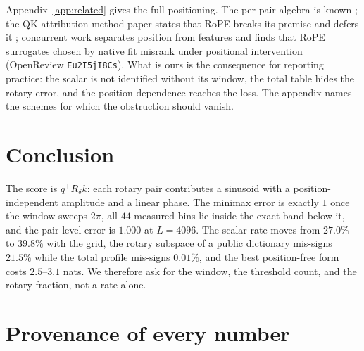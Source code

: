 \documentclass{article}
\theoremstyle{plain}
\theoremstyle{remark}
\newcommand{\R}{R}
\begin{document}
Appendix~\ref{app:related} gives the full positioning. The per-pair algebra is
known \citep{chachamovits2026phase,liang2026roaware}; the QK-attribution method
paper states that RoPE breaks its premise and defers it \citep{kamath2025tracing};
concurrent work separates position from features \citep{kim2026pax} and finds
that RoPE surrogates chosen by native fit misrank under positional intervention
(OpenReview \texttt{Eu2I5jI8Cs}). What is ours is the consequence for reporting
practice: the scalar is not identified without its window, the total table hides
the rotary error, and the position dependence reaches the loss. The appendix
names the schemes for which the obstruction should vanish.
\enlargethispage{3\baselineskip}
\section{Conclusion}

The score is $q^{\!\top}\R_{\delta}k$: each rotary pair
contributes a sinusoid with a position-independent amplitude and a linear phase.
The minimax error is exactly $1$ once the window sweeps $2\pi$, all $44$ measured
bins lie inside the exact band below it, and the pair-level error is $1.000$ at
$L=4096$. The scalar rate moves from $27.0\%$ to $39.8\%$ with the grid, the
rotary subspace of a public dictionary mis-signs $21.5\%$ while the total profile
mis-signs $0.01\%$, and the best position-free form costs $2.5$--$3.1$ nats. We
therefore ask for the window, the threshold count, and the rotary fraction, not
a rate alone.

\clearpage
\appendix
\suppressfloats[t]
\section{Provenance of every number}
\label{app:provenance}
\end{document}
